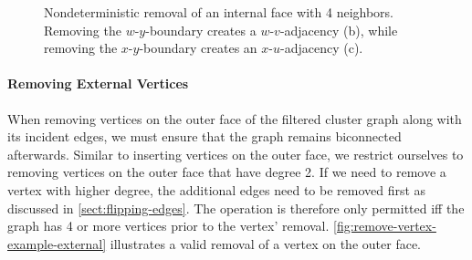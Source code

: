 \begin{figure}[H]
	\centering
	\quad
	\qquad
	\caption{Nondeterministic removal of an internal face with 4 neighbors. Removing the $w$-$y$-boundary creates a $w$-$v$-adjacency (b), while removing the $x$-$y$-boundary creates an $x$-$u$-adjacency (c).}
	\label{fig:remove-vertex-nondeterministic-adjacencies}
\end{figure}



\paragraph{Removing External Vertices}

When removing vertices on the outer face of the filtered cluster graph along with its incident edges, we must ensure that the graph remains biconnected afterwards.
Similar to inserting vertices on the outer face, we restrict ourselves to removing vertices on the outer face that have degree 2.
If we need to remove a vertex with higher degree, the additional edges need to be removed first as discussed in \cref{sect:flipping-edges}.
The operation is therefore only permitted iff the graph has 4 or more vertices prior to the vertex' removal.
\cref{fig:remove-vertex-example-external} illustrates a valid removal of a vertex on the outer face.


